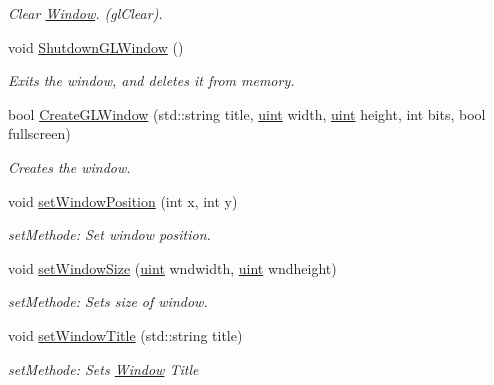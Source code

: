 \begin{DoxyCompactItemize}
\begin{DoxyCompactList}\small\item\em Clear \hyperlink{class_f2_c_1_1_window}{Window}. (glClear). \item\end{DoxyCompactList}\item 
\hypertarget{class_f2_c_1_1_window_a7d92448d55b3608df74ed6be97bdeef9}{
void \hyperlink{class_f2_c_1_1_window_a7d92448d55b3608df74ed6be97bdeef9}{ShutdownGLWindow} ()}
\label{class_f2_c_1_1_window_a7d92448d55b3608df74ed6be97bdeef9}

\begin{DoxyCompactList}\small\item\em Exits the window, and deletes it from memory. \item\end{DoxyCompactList}\item 
bool \hyperlink{class_f2_c_1_1_window_aaf0f8a2b7bf33c732dc32ca862fc8dac}{CreateGLWindow} (std::string title, \hyperlink{namespace_f2_c_a58be2bac9eb3e3c99cb41b6008bf4fae}{uint} width, \hyperlink{namespace_f2_c_a58be2bac9eb3e3c99cb41b6008bf4fae}{uint} height, int bits, bool fullscreen)
\begin{DoxyCompactList}\small\item\em Creates the window. \item\end{DoxyCompactList}\item 
void \hyperlink{class_f2_c_1_1_window_a1386414654c4e87f67f31076a8b34aa5}{setWindowPosition} (int x, int y)
\begin{DoxyCompactList}\small\item\em setMethode: Set window position. \item\end{DoxyCompactList}\item 
void \hyperlink{class_f2_c_1_1_window_a31ea5cf746375e50bbc3d547eb249155}{setWindowSize} (\hyperlink{namespace_f2_c_a58be2bac9eb3e3c99cb41b6008bf4fae}{uint} wndwidth, \hyperlink{namespace_f2_c_a58be2bac9eb3e3c99cb41b6008bf4fae}{uint} wndheight)
\begin{DoxyCompactList}\small\item\em setMethode: Sets size of window. \item\end{DoxyCompactList}\item 
void \hyperlink{class_f2_c_1_1_window_a7d8c67d945748f4a2c2effcf4a29022d}{setWindowTitle} (std::string title)
\begin{DoxyCompactList}\small\item\em setMethode: Sets \hyperlink{class_f2_c_1_1_window}{Window} Title \item\end{DoxyCompactList}\item 

\end{DoxyCompactItemize}
